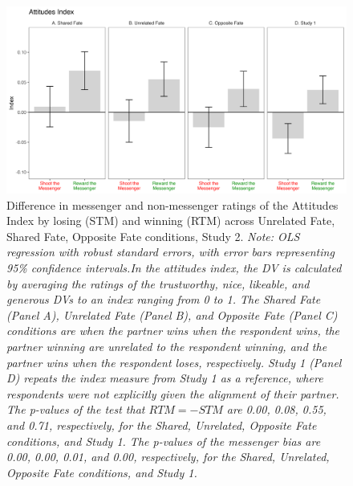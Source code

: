 \renewcommand{\baselinestretch}{1.25}%
\begin{figure}[!t]%
  \centering
  \includegraphics[width=1.0\textwidth]{figures/study2_main_attitude_all.png}
  \caption{Difference in messenger and non-messenger ratings of the Attitudes Index by losing (STM) and winning (RTM) across Unrelated Fate, Shared Fate, Opposite Fate conditions, Study 2. 
  \textit{Note: OLS regression with robust standard errors, with error bars representing 95\% confidence intervals.In the attitudes index, the DV is calculated by averaging the ratings of the trustworthy, nice, likeable, and generous DVs to an index ranging from 0 to 1. The Shared Fate (Panel A), Unrelated Fate (Panel B), and Opposite Fate (Panel C) conditions are when the partner wins when the respondent wins, the partner winning are unrelated to the respondent winning, and the partner wins when the respondent loses, respectively. Study 1 (Panel D) repeats the index measure from Study 1 as a reference, where respondents were not explicitly given the alignment of their partner. The p-values of the test that $RTM = -STM$ are 0.00, 0.08, 0.55, and 0.71, respectively, for the Shared, Unrelated, Opposite Fate conditions, and Study 1. The p-values of the messenger bias are 0.00, 0.00, 0.01, and 0.00, respectively, for the Shared, Unrelated, Opposite Fate conditions, and Study 1.}}
  \label{fig:study2_main_attitude_all}
\end{figure}%
\renewcommand{\baselinestretch}{1.67}%
